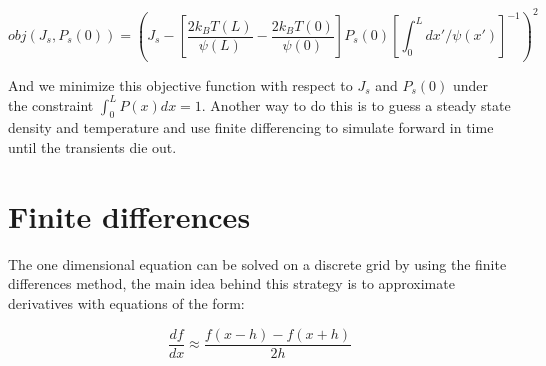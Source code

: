 \begin{equation}
obj(J_s, P_s(0)) = \left (J_s - \left [\frac{2 k_B T(L)}{\psi(L)} - \frac{2 k_B T(0)}{\psi(0)}  \right] P_s(0) \left [\int_0^L dx'/\psi(x') \right]^{-1} \right)^2  \label{eqn:Objective}
\end{equation}

And we minimize this objective function with respect to $J_s$ and $P_s(0)$ under the constraint $\int_0^L P(x) dx = 1$. Another way to do this is to guess a steady state density and temperature and use finite differencing to simulate forward in time until the transients die out.

\section{Finite differences}  \label{numerics}
The one dimensional equation can be solved on a discrete grid by using the finite differences method, the main idea behind this strategy is to approximate derivatives with equations of the form:

\begin{equation}
\frac{d f}{d x} \approx \frac{f(x - h) - f(x + h)}{2h}
\end{equation}

